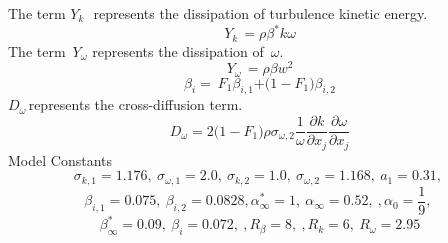 \documentclass[Afour,sagev,times]{sagej}
\begin{document}
\noindent The term $Y_{k\ }$~represents the dissipation of turbulence kinetic energy. 
\begin{equation} \label{GrindEQ__20_} 
Y_{k\mathrm{\ }}\mathrm{=}\rho {\beta }^{\mathrm{*}}k\omega  
\end{equation} 
The term~$Y_{\omega }$ represents the dissipation of~\textit{$\omega$}. 
\begin{equation} \label{GrindEQ__21_} 
Y_{\omega \mathrm{\ }}\mathrm{=}\rho \beta w^{\mathrm{2}} 
\end{equation} 
\begin{equation} \label{GrindEQ__22_} 
{\beta }_i\mathrm{=\ }F_{\mathrm{1}}{\beta }_{i\mathrm{,1}}\mathrm{+(1-}F_{\mathrm{1}}\mathrm{)}{\beta }_{i\mathrm{,2}} 
\end{equation} 
$D_{\omega \ }$represents the cross-diffusion term.       
\begin{equation} \label{GrindEQ__23_} 
D_{\omega }\mathrm{=2(1-}F_{\mathrm{1}}\mathrm{)}\rho {\sigma }_{\omega \mathrm{,2}}\frac{\mathrm{1}}{\omega }\frac{\partial k}{\partial x_j}\frac{\partial \omega }{\partial x_j} 
\end{equation} 
Model Constants
\[{\sigma }_{k\mathrm{,1}}\mathrm{=1.176,\ }{\sigma }_{\omega \mathrm{,1}}\mathrm{=2.0,\ }{\sigma }_{k\mathrm{,2}}\mathrm{=1.0,\ }{\sigma }_{\omega \mathrm{,2}}\mathrm{=1.168,\ }a_{\mathrm{1}}\mathrm{=0.31,\ }\]
\[{\beta }_{i\mathrm{,1}}\mathrm{=0.075,\ }{\beta }_{i\mathrm{,2}}\mathrm{=0.0828},{\alpha }^{\mathrm{*}}_{\mathrm{\infty }}\mathrm{=1,\ }{\alpha }_{\mathrm{\infty }}\mathrm{=0.52,\ },{\alpha }_0\mathrm{=}\frac{\mathrm{1}}{\mathrm{9}}\mathrm{,\ }\] 
\[{\beta }^{\mathrm{*}}_{\mathrm{\infty }}\mathrm{=0.09,\ }{\beta }_i\mathrm{=0.072,\ },R_{\beta }\mathrm{=8,\ },R_k\mathrm{=6,\ }R_{\omega }\mathrm{=2.95}\]
\end{document}
